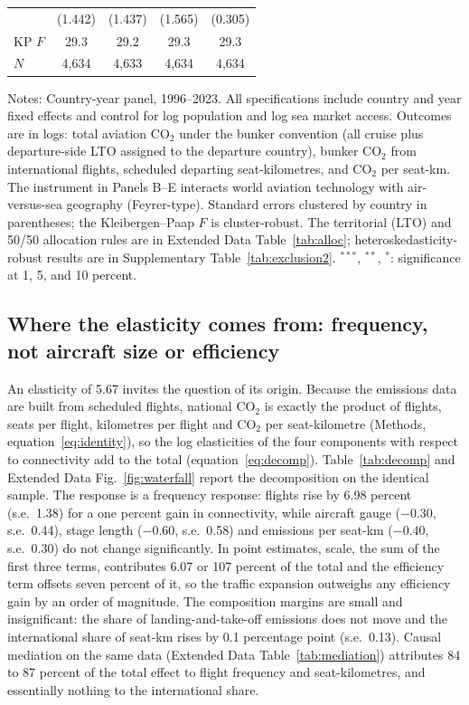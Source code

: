 \documentclass[12pt]{article}
\begin{document}
\begin{table}[H]
{\begin{threeparttable}
\begin{tabular}{lcccc}
   & (1.442) & (1.437) & (1.565) & (0.305) \\
  KP $F$ & 29.3 & 29.2 & 29.3 & 29.3 \\
  $N$ & 4,634 & 4,633 & 4,634 & 4,634 \\
\bottomrule
\end{tabular}
\begin{tablenotes}[flushleft]
\footnotesize
\item Notes: Country-year panel, 1996--2023. All specifications include country and year fixed effects and control for log population and log sea market access. Outcomes are in logs: total aviation CO$_2$ under the bunker convention (all cruise plus departure-side LTO assigned to the departure country), bunker CO$_2$ from international flights, scheduled departing seat-kilometres, and CO$_2$ per seat-km. The instrument in Panels B--E interacts world aviation technology with air-versus-sea geography (Feyrer-type). Standard errors clustered by country in parentheses; the Kleibergen--Paap $F$ is cluster-robust. The territorial (LTO) and 50/50 allocation rules are in Extended Data Table~\ref{tab:alloc}; heteroskedasticity-robust results are in Supplementary Table~\ref{tab:exclusion2}. $^{***}$, $^{**}$, $^{*}$: significance at 1, 5, and 10 percent.
\end{tablenotes}
\end{threeparttable}}
\end{table}

\subsection*{Where the elasticity comes from: frequency, not aircraft size
or efficiency}
An elasticity of 5.67 invites the question of its origin. Because the
emissions data are built from scheduled flights, national CO$_2$ is
exactly the product of flights, seats per flight, kilometres per flight and
CO$_2$ per seat-kilometre (Methods, equation~\ref{eq:identity}), so the
log elasticities of the four components with respect to connectivity add
to the total (equation~\ref{eq:decomp}). Table~\ref{tab:decomp} and Extended Data
Fig.~\ref{fig:waterfall} report the decomposition on the identical sample.
The response is a frequency response: flights rise by 6.98 percent (s.e.\
1.38) for a one percent gain in connectivity, while aircraft gauge
($-0.30$, s.e.\ 0.44), stage length ($-0.60$, s.e.\ 0.58) and emissions
per seat-km ($-0.40$, s.e.\ 0.30) do not change significantly. In point
estimates, scale, the sum of the first three terms, contributes 6.07 or
107 percent of the total and the efficiency term offsets seven percent of
it, so the traffic expansion outweighs any efficiency gain by an order of
magnitude. The composition margins are small and insignificant: the share
of landing-and-take-off emissions does not move and the international
share of seat-km rises by 0.1 percentage point (s.e.\ 0.13). Causal
mediation on the same data (Extended Data Table~\ref{tab:mediation})
attributes 84 to 87 percent of the total effect to flight frequency and
seat-kilometres, and essentially nothing to the international share.
\end{document}
